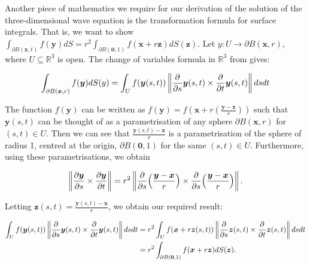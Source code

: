 \documentclass[a4paper, 12pt]{article}
\numberwithin{equation}{section}
\begin{document}
Another piece of mathematics we require for our derivation of the solution of
the three-dimensional wave equation is the transformation formula for surface
integrals. That is, we want to show $\int_{\partial
B(\boldsymbol{x},t)}f(\boldsymbol{y})dS=r^2\int_{\partial B(\boldsymbol{0},1)}
f(\boldsymbol{x}+r\boldsymbol{z})dS(\boldsymbol{z})$. Let $y:U \rightarrow
\partial B(\boldsymbol{x}, r)$, where $U \subseteq \mathbb{R}^3$ is open. The change of variables
formula in $\mathbb{R}^3$ from \cite[Ch. 11, Th. 11.1]{LooSter} gives:

\begin{equation*}
    \int_{\partial B(\boldsymbol{x},r)}f(\boldsymbol{y})dS(y)=\int_U f(\boldsymbol{y}(s,t))\left\| \diffp[1]{}{s}\boldsymbol{y}(s, t) \times \diffp[1]{}{t}\boldsymbol{y}(s, t) \right \|ds dt
\end{equation*}

The function $f(\boldsymbol{y})$ can be written as
$f(\boldsymbol{y})=f(\boldsymbol{x}+r(\frac{\boldsymbol{y}-\boldsymbol{x}}{r}))$
such that $\boldsymbol{y}(s,t)$ can be thought of as a parametrisation of any
sphere $\partial B(\boldsymbol{x},r)$ for $(s,t)\in U$. Then we can see that
$\frac{\boldsymbol{y}(s,t)-\boldsymbol{x}}{r}$ is a parametrisation of the
sphere of radius 1, centred at the origin, $\partial B(\boldsymbol{0},1)$ for
the same $(s,t)\in U$. Furthermore, using these parametrisations, we obtain

\begin{equation*}
    \left \| \diffp[1]{\boldsymbol{y}}{s} \times \diffp[1]{\boldsymbol{y}}{t} \right \| =r^2 \left \| \diffp[1]{}{s}\Big(\frac{\boldsymbol{y}-\boldsymbol{x}}{r}\Big) \times \diffp[1]{}{s}\Big( \frac{\boldsymbol{y}-\boldsymbol{x}}{r}\Big) \right \|.
\end{equation*}

Letting $\boldsymbol{z}(s,t)=\frac{\boldsymbol{y}(s,t)-\boldsymbol{x}}{r}$, we
obtain our required result:

\begin{equation*}
    \begin{aligned}
    \int_U f(\boldsymbol{y}(s,t)) \left \| \diffp[1]{}{s}\boldsymbol{y}(s, t) \times \diffp{}{t}\boldsymbol{y}(s, t) \right \| dsdt&=r^2\int_U f(\boldsymbol{x}+r\boldsymbol{z}(s,t)) \left \| \diffp[1]{}{s}\boldsymbol{z}(s, t) \times \diffp[1]{}{t}\boldsymbol{z}(s, t) \right \| dsdt\\
    &=r^2\int_{\partial B(\boldsymbol{0},1)}f(\boldsymbol{x}+r\boldsymbol{z})dS(\boldsymbol{z}).
    \end{aligned}
\end{equation*}
\end{document}
